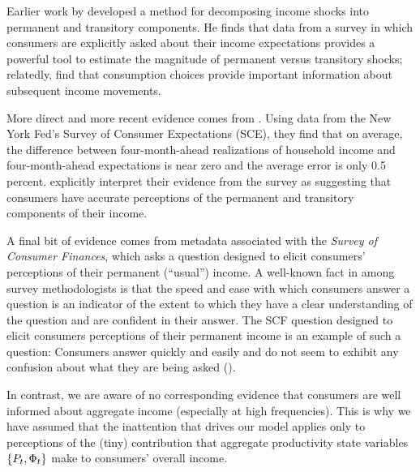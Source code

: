 \documentclass[titlepage]{./econtex}
\begin{document}
Earlier work by \cite{pistaferriSuperior} developed a method for decomposing income shocks into permanent and transitory components.  He finds that data from a survey in which consumers are explicitly asked about their income expectations provides a powerful tool to estimate the magnitude of permanent versus transitory shocks; relatedly, \cite{gsInferring} find that consumption choices provide important information about subsequent income movements.

More direct and more recent evidence comes from \cite{kmpIncomeExpectations}.  Using data from the New York Fed's Survey of Consumer Expectations (SCE), they find that on average, the difference between four-month-ahead realizations of household income and four-month-ahead expectations is near zero and the average error is only 0.5 percent. \cite{kmpIncomeExpectations} explicitly interpret their evidence from the survey as suggesting that consumers have accurate perceptions of the permanent and transitory components of their income.

A final bit of evidence comes from metadata associated with the \textit{Survey of Consumer Finances}, which asks a question designed to elicit consumers' perceptions of their permanent (``usual'') income.  A well-known fact in among survey methodologists is that the speed and ease with which consumers answer a question is an indicator of the extent to which they have a clear understanding of the question and are confident in their answer.  The SCF question designed to elicit consumers perceptions of their permanent income is an example of such a question: Consumers answer quickly and easily and do not seem to exhibit any confusion about what they are being asked (\cite{kennickellPermanent}).

In contrast, we are aware of no corresponding evidence that consumers are well informed about aggregate income (especially at high frequencies). %
 This is why we have assumed that the inattention that drives our model applies only to perceptions of the (tiny) contribution that aggregate productivity state variables $\{P_t,\Phi_t\}$ make to consumers' overall income.
\end{document}
